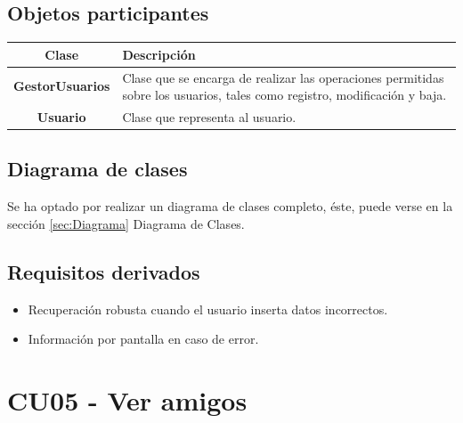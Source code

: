 \documentclass[12pt, a4paper, titlepage]{article}
\begin{document}
\subsection{Objetos participantes}
\begin{center}

\begin{tabular}{|c|p{12cm}|}
	\hline
	\textbf{Clase} & \textbf{Descripción}\\ \hline
	\textbf{GestorUsuarios} &  Clase que se encarga de realizar las operaciones permitidas sobre los usuarios, tales como registro, modificación y baja.\\ \hline
	\textbf{Usuario} & Clase que representa al usuario. \\ \hline
\end{tabular}

\end{center}


\subsection{Diagrama de clases}
Se ha optado por realizar un diagrama de clases completo, éste, puede verse en la sección \ref{sec:Diagrama} Diagrama de Clases.
\subsection{Requisitos derivados}

\begin{itemize}
	\item Recuperación robusta cuando el usuario inserta datos incorrectos.
	\item Información por pantalla en caso de error.
\end{itemize}

\section{CU05 - Ver amigos}
\end{document}
